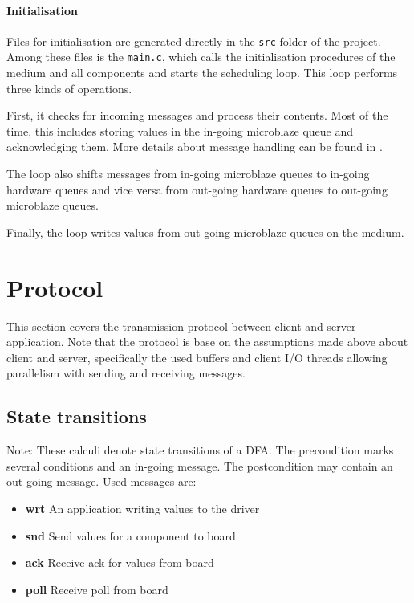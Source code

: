 \documentclass{report}
\begin{document}
\paragraph{Initialisation}
Files for initialisation are generated directly in the \texttt{src} folder of the project. Among these files is the \texttt{main.c}, which calls the initialisation procedures of the medium and all components and starts the scheduling loop. This loop performs three kinds of operations.

First, it checks for incoming messages and process their contents. Most of the time, this includes storing values in the in-going microblaze queue and acknowledging them. More details about message handling can be found in .

The loop also shifts messages from in-going microblaze queues to in-going hardware queues and vice versa from out-going hardware queues to out-going microblaze queues. 

Finally, the loop writes values from out-going microblaze queues on the medium.

\newpage
\section{Protocol}
\label{sec:protocol}
This section covers the transmission protocol between client and server application. Note that the protocol is base on the assumptions made above about client and server, specifically the used buffers and client I/O threads allowing parallelism with sending and receiving messages.

\subsection{State transitions}

Note: These calculi denote state transitions of a DFA. The precondition marks several conditions and an in-going message. The postcondition may contain an out-going message. Used messages are:
\begin{itemize} \itemsep1pt \parskip0pt 
\item \textbf{wrt} An application writing values to the driver
\item \textbf{snd} Send values for a component to board
\item \textbf{ack} Receive ack for values from board
\item \textbf{poll} Receive poll from board
\end{itemize}
\end{document}
